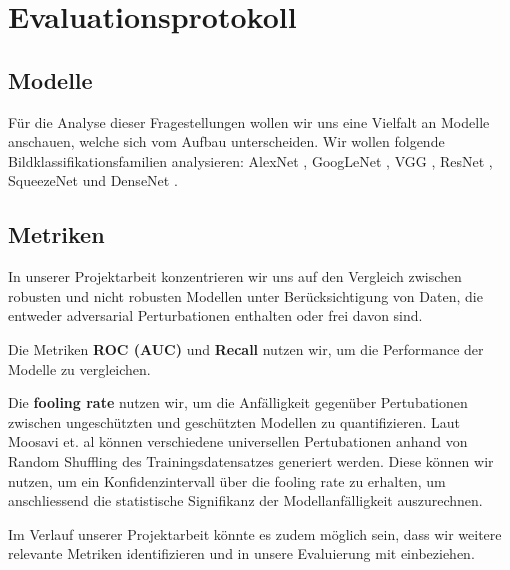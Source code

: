 \section{Evaluationsprotokoll}

\subsection{Modelle} 
Für die Analyse dieser Fragestellungen wollen wir uns eine Vielfalt an Modelle anschauen, welche sich vom Aufbau unterscheiden. Wir wollen folgende Bildklassifikationsfamilien analysieren: AlexNet \cite{krizhevsky_imagenet_2012}, GoogLeNet \cite{szegedy_going_2014}, VGG \cite{simonyan_very_2015}, ResNet \cite{he_deep_2015}, SqueezeNet \cite{iandola_squeezenet_2016} und DenseNet \cite{huang_densely_2018}.

\subsection{Metriken} 
In unserer Projektarbeit konzentrieren wir uns auf den Vergleich zwischen robusten und nicht robusten Modellen unter Berücksichtigung von Daten, die entweder adversarial Perturbationen enthalten oder frei davon sind.

Die Metriken \textbf{ROC (AUC)} und \textbf{Recall} nutzen wir, um die Performance der Modelle zu vergleichen.

Die \textbf{fooling rate} \cite{moosavi-dezfooli_universal_2017} nutzen wir, um die Anfälligkeit gegenüber Pertubationen zwischen ungeschützten und geschützten Modellen zu quantifizieren. Laut Moosavi et. al \cite{moosavi-dezfooli_universal_2017} können verschiedene universellen Pertubationen anhand von Random Shuffling des Trainingsdatensatzes generiert werden. Diese können wir nutzen, um ein Konfidenzintervall über die fooling rate zu erhalten, um anschliessend die statistische Signifikanz der Modellanfälligkeit auszurechnen. 

Im Verlauf unserer Projektarbeit könnte es zudem möglich sein, dass wir weitere relevante Metriken identifizieren und in unsere Evaluierung mit einbeziehen. 




